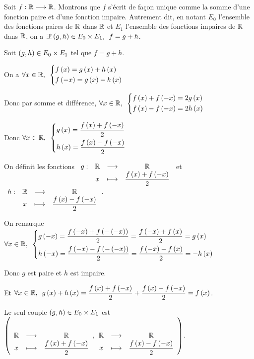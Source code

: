 \begin{ex}
Soit \(f:\mathbb{R}\longrightarrow\mathbb{R}\). Montrons que \(f\) s'écrit de façon unique comme la somme d'une fonction paire et d'une fonction impaire. Autrement dit, en notant \(E_0\) l'ensemble des fonctions paires de \(\mathbb{R}\) dans \(\mathbb{R}\) et \(E_1\) l'ensemble des fonctions impaires de \(\mathbb{R}\) dans \(\mathbb{R}\), on a \(\quantifs{\exists!\paren{g,h}\in E_0\times E_1}f=g+h\).

\analyse

Soit \(\left(g,h\right)\in E_0\times E_1\) tel que \(f=g+h\).

On a \(\quantifs{\forall x\in\R}\begin{dcases}f\paren{x}=g\paren{x}+h\paren{x} \\ f\paren{-x}=g\paren{x}-h\paren{x}\end{dcases}\)

Donc par somme et différence, \(\quantifs{\forall x\in\R}\begin{dcases}f\paren{x}+f\paren{-x}=2g\paren{x} \\ f\paren{x}-f\paren{-x}=2h\paren{x}\end{dcases}\)

Donc \(\quantifs{\forall x\in\R}\begin{dcases}g\paren{x}=\dfrac{f\paren{x}+f\paren{-x}}{2} \\ h\paren{x}=\dfrac{f\paren{x}-f\paren{-x}}{2}\end{dcases}\)

\synthese

On définit les fonctions \(\begin{array}[t]{cccc}g : & \mathbb{R} & \longrightarrow & \mathbb{R} \\ & x & \longmapsto & \dfrac{f\left(x\right)+f\left(-x\right)}{2}\end{array}\) et \(\begin{array}[t]{cccc}h : & \mathbb{R} & \longrightarrow & \mathbb{R} \\ & x & \longmapsto & \dfrac{f\left(x\right)-f\left(-x\right)}{2}\end{array}\).

On remarque \(\quantifs{\forall x\in\R}\begin{dcases}g\paren{-x}=\dfrac{f\paren{-x}+f\paren{-\paren{-x}}}{2}=\dfrac{f\paren{-x}+f\paren{x}}{2}=g\paren{x} \\ h\paren{-x}=\dfrac{f\paren{-x}-f\paren{-\paren{-x}}}{2}=\dfrac{f\paren{-x}-f\paren{x}}{2}=-h\paren{x}\end{dcases}\)

Donc \(g\) est paire et \(h\) est impaire.

Et \(\quantifs{\forall x\in\R}g\paren{x}+h\paren{x}=\dfrac{f\paren{x}+f\paren{-x}}{2}+\dfrac{f\paren{x}-f\paren{-x}}{2}=f\paren{x}\).

\conclusion

Le seul couple \(\left(g,h\right)\in E_0\times E_1\) est \(\left(\begin{array}[t]{ccc}\mathbb{R} & \longrightarrow & \mathbb{R} \\ x & \longmapsto & \dfrac{f\left(x\right)+f\left(-x\right)}{2}\end{array},\begin{array}[t]{ccc}\mathbb{R} & \longrightarrow & \mathbb{R} \\ x & \longmapsto & \dfrac{f\left(x\right)-f\left(-x\right)}{2}\end{array}\right)\).
\end{ex}

